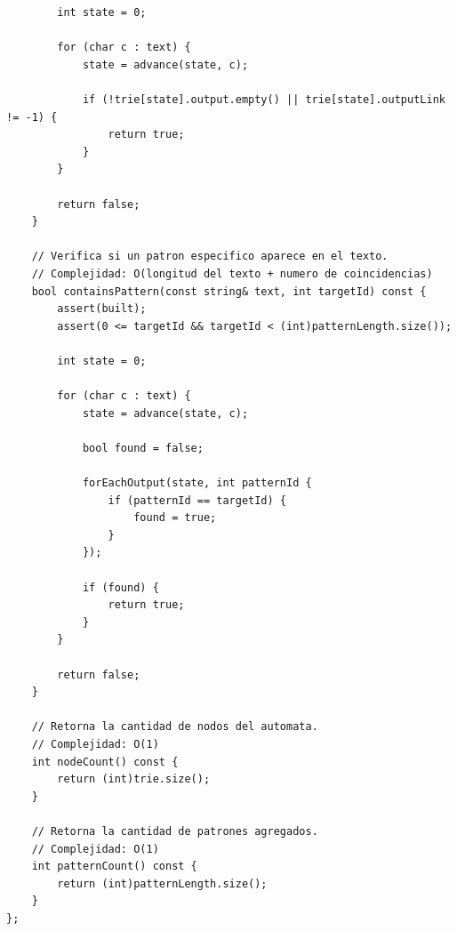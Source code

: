 \begin{lstlisting}
        int state = 0;

        for (char c : text) {
            state = advance(state, c);

            if (!trie[state].output.empty() || trie[state].outputLink != -1) {
                return true;
            }
        }

        return false;
    }

    // Verifica si un patron especifico aparece en el texto.
    // Complejidad: O(longitud del texto + numero de coincidencias)
    bool containsPattern(const string& text, int targetId) const {
        assert(built);
        assert(0 <= targetId && targetId < (int)patternLength.size());

        int state = 0;

        for (char c : text) {
            state = advance(state, c);

            bool found = false;

            forEachOutput(state, int patternId {
                if (patternId == targetId) {
                    found = true;
                }
            });

            if (found) {
                return true;
            }
        }

        return false;
    }

    // Retorna la cantidad de nodos del automata.
    // Complejidad: O(1)
    int nodeCount() const {
        return (int)trie.size();
    }

    // Retorna la cantidad de patrones agregados.
    // Complejidad: O(1)
    int patternCount() const {
        return (int)patternLength.size();
    }
};\end{lstlisting}

